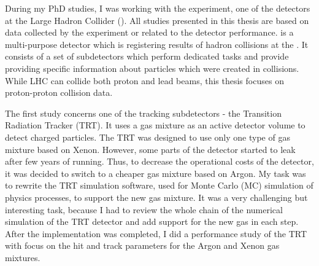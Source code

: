 




\begin{preface}

During my PhD studies, I was working with the \ATLAS experiment, one of the detectors at the Large Hadron Collider (\LHC). All studies presented in this thesis are based on data collected by the \ATLAS experiment or related to the \ATLAS detector performance.
\ATLAS is a multi-purpose detector which is registering results of hadron collisions at the \LHC. It consists of a set of subdetectors which perform dedicated tasks and provide providing specific information about particles which were created in collisions.
While LHC can collide both proton and lead beams, this thesis focuses on proton-proton collision data.

The first study concerns one of the \ATLAS tracking subdetectors - the Transition Radiation Tracker (TRT).
It uses a gas mixture as an active detector volume to detect charged particles. The TRT was designed to use only one type of gas mixture based on Xenon. However, some parts of the detector started to leak after few years of running. Thus, to decrease the operational costs of the detector, it was decided to switch to a cheaper gas mixture based on Argon. My task was to rewrite the TRT simulation software, used for Monte Carlo (MC) simulation of physics processes, to support the new gas mixture. It was a very challenging but interesting task, because I had to review the whole chain of the numerical simulation of the TRT detector and add support for the new gas in each step. After the implementation was completed, I did a performance study of the TRT with focus on the hit and track parameters for the Argon and Xenon gas mixtures.


\end{preface}
